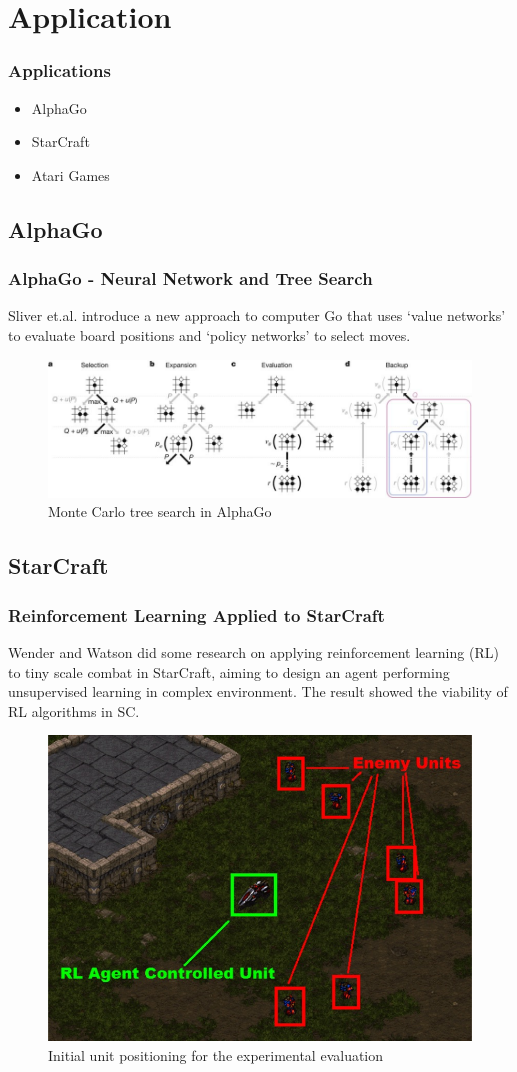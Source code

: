 \documentclass{beamer}
\begin{document}
\section{Application}

\begin{frame}
  \frametitle{Applications}
  \begin{itemize}
    \item AlphaGo
    \item StarCraft
    \item Atari Games
  \end{itemize}
  

\end{frame}
\subsection{AlphaGo}
\begin{frame}
  \frametitle{AlphaGo - Neural Network and Tree Search}
  Sliver et.al. \cite{5} introduce a new approach to computer Go that uses ‘value networks’ to evaluate board positions and ‘policy networks’ to select moves.
  \begin{figure}
    \includegraphics[width=1\linewidth]{figures/gosearch}
    \caption{ Monte Carlo tree search in AlphaGo}
  \end{figure}
\end{frame}

\subsection{StarCraft}
\begin{frame}
  \frametitle{Reinforcement Learning Applied to StarCraft}
  Wender and Watson did some research \cite{6} on applying reinforcement learning (RL) to tiny scale combat in StarCraft, aiming to design an agent performing unsupervised learning in complex environment. The result showed the viability of RL algorithms in SC.
  \begin{figure}
    \includegraphics[width=0.6\linewidth]{figures/sc}
    \caption{ Initial unit positioning for the experimental evaluation}
  \end{figure}
\end{frame}
\end{document}
